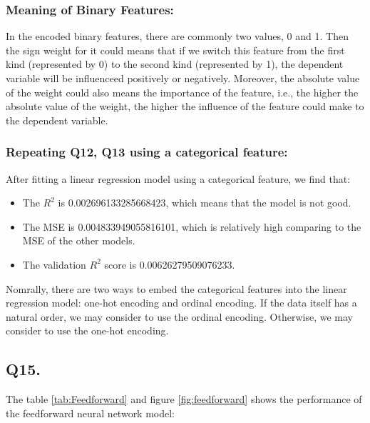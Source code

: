\documentclass{article}
\begin{document}
\subsubsection*{Meaning of Binary Features:}

In the encoded binary features, there are commonly two values, 0 and 1. 
Then the sign weight for it could means that if we switch this feature from the first kind (represented by 0) to the second kind (represented by 1), the dependent variable will be influenceed positively or negatively.
Moreover, the absolute value of the weight could also means the importance of the feature, i.e., the higher the absolute value of the weight, the higher the influence of the feature could make to the dependent variable.

\subsubsection*{Repeating Q12, Q13 using a categorical feature:}

After fitting a linear regression model using a categorical feature, we find that:

\begin{itemize}
    \item The $R^2$ is 0.002696133285668423, which means that the model is not good.
    \item The MSE is 0.004833949055816101, which is relatively high comparing to the MSE of the other models.
    \item The validation $R^2$ score is 0.00626279509076233.
\end{itemize}

Nomrally, there are two ways to embed the categorical features into the linear regression model: one-hot encoding and ordinal encoding. If the data itself has a natural order, we may consider to use the ordinal encoding. Otherwise, we may consider to use the one-hot encoding. 

\subsection*{Q15.}

The table \ref{tab:Feedforward} and figure \ref{fig:feedforward} shows the performance of the feedforward neural network model:
\end{document}
